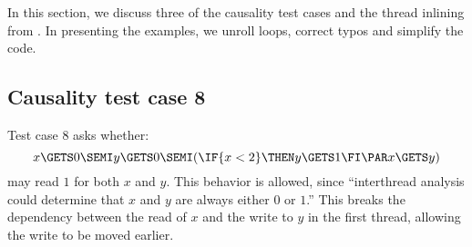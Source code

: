 In this section, we discuss three of the causality test cases and the thread
inlining from \cite{Manson:2005:JMM:1047659.1040336}.  In presenting the
examples, we unroll loops, correct typos and simplify the code.  

\subsection{Causality test case 8}

\begin{comment}
Consider the program variant:

x=0; r=x; if(r<2){y=1} || x=5

[[ y=1 ]] contains (Wy1)

[[ if(r<2){y=1} ]] contains (r<2|Wy1)

[[ r=x; if(r<2){y=1} ]] contains (Rx5)  (x<2|Wy1)  //with no order

[[ x=0; r=x; if(r<2){y=1} ]] contains (Wx0)  (Rx5)  (x<2|Wy1) //does not work, since violates (6a) 𝜆Φ′(𝑒) implies 𝜆Φ(𝑒)[𝑣/𝑥].
 

Another example:
So consider the single threaded program

x=4; x=5; r=x; if(r==4){y=1}

Clearly, this should not be able to give us Wy1.
Here is why that is not possible:

[[ y=1 ]] contains (Wy1)

[[ if(r==4){y=1} ]] contains (r==4|Wy1)

[[ r=x; if(r==4){y=1} ]] contains (Rx5)  (x==4|Wy1) // with no order

[[ x=5; r=x; if(r==4){y=1} ]] contains (Wx5)-->(Rx5)  (5==4|Wy1) // 5 is forced.
\end{comment}

Test case 8 asks whether:
\begin{displaymath}
   x\GETS 0\SEMI
   y\GETS 0\SEMI
  (\IF{x<2}\THEN y\GETS 1\FI 
  \PAR
  x\GETS y)
\end{displaymath}
may read $1$ for both $x$ and $y$.  This behavior is allowed, since
``interthread analysis could determine that $x$ and $y$ are always either $0$
or $1$.''  This breaks the dependency between the read of $x$ and the write
to $y$ in the first thread, allowing the write to be moved earlier.

